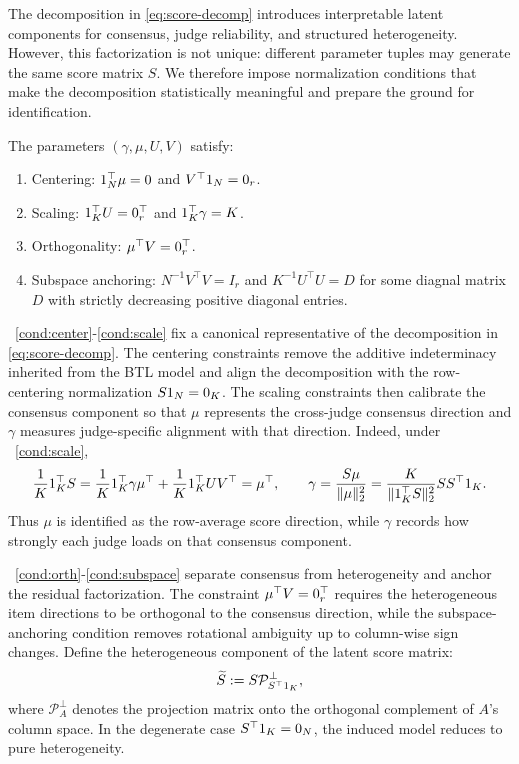 \documentclass{article}
\begin{document}
\begin{bibunit}[unsrtnat]
The decomposition in \eqref{eq:score-decomp} introduces interpretable latent components for consensus, judge reliability, and structured heterogeneity. However, this factorization is not unique: different parameter tuples may generate the same score matrix \(S\). 
We therefore impose normalization conditions that make the decomposition statistically meaningful and prepare the ground for identification.
\begin{condition}[Normalization]\label{cond:norm}
    The parameters $(\gamma,\mu,U,V)$ satisfy:
    \begin{enumerate}[label=(\roman*)]
        \item\label{cond:center} {Centering:} $1_N^\top \mu = 0$ and $V^\top 1_N = 0_r$.
        \item\label{cond:scale} {Scaling:} $1_K^\top U = 0_r^\top$ and $1_K^\top \gamma = K$.
        \item\label{cond:orth} {Orthogonality:} $\mu^\top V = 0_r^\top$.
        \item\label{cond:subspace} {Subspace anchoring:} $N^{-1}V^\top V = I_r$ and $K^{-1}U^\top U = D$ for some diagnal matrix $D$ with strictly decreasing positive diagonal entries.
    \end{enumerate}
\end{condition}

~\ref{cond:center}-\ref{cond:scale} fix a canonical representative of the decomposition in \eqref{eq:score-decomp}. 
The centering constraints remove the additive indeterminacy inherited from the BTL model and align 
the decomposition with the row-centering normalization \(S1_N=0_K\). The scaling constraints 
then calibrate the consensus component so that \(\mu\) represents the cross-judge consensus direction 
and \(\gamma\) measures judge-specific alignment with that direction. Indeed, under ~\ref{cond:scale},
\[
\frac{1}{K}1_K^\top S
=
\frac{1}{K}1_K^\top \gamma \mu^\top
+
\frac{1}{K}1_K^\top U V^\top
=
\mu^\top,
\qquad
\gamma
=
\frac{S\mu}{\|\mu\|_2^2}
=
\frac{K}{\|1_K^\top S\|_2^2}SS^\top 1_K.
\]
Thus \(\mu\) is identified as the row-average score direction, while \(\gamma\) records how strongly each judge loads on that consensus component.

~\ref{cond:orth}-\ref{cond:subspace} separate consensus from heterogeneity and anchor the residual factorization. 
The constraint \(\mu^\top V=0_r^\top\) requires the heterogeneous item directions to be orthogonal to the consensus direction, while the subspace-anchoring condition removes rotational ambiguity up to column-wise sign changes. 
Define the heterogeneous component of the latent score matrix:
\begin{equation} \label{eq:S-residual}
    \widetilde{S} := S\mathcal{P}_{S^\top 1_K}^\perp, 
\end{equation}
where $\mathcal{P}_A^\perp$ denotes the projection matrix onto the orthogonal complement of $A$'s column space.
In the degenerate case \(S^\top1_K=0_N\), the induced model reduces to pure heterogeneity.


\end{bibunit}
\end{document}
